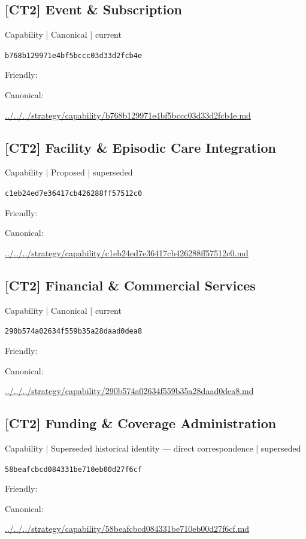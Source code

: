 \documentclass[10pt,a4paper]{article}
\begin{document}
\subsection*{[CT2] Event \& Subscription}
{\small Capability | Canonical | current}\par
\texttt{b768b129971e4bf5bccc03d33d2fcb4e}\par
Friendly: \par
Canonical: \par
{\footnotesize\url{../../../strategy/capability/b768b129971e4bf5bccc03d33d2fcb4e.md}}\par
\subsection*{[CT2] Facility \& Episodic Care Integration}
{\small Capability | Proposed | superseded}\par
\texttt{c1eb24ed7e36417cb426288ff57512c0}\par
Friendly: \par
Canonical: \par
{\footnotesize\url{../../../strategy/capability/c1eb24ed7e36417cb426288ff57512c0.md}}\par
\subsection*{[CT2] Financial \& Commercial Services}
{\small Capability | Canonical | current}\par
\texttt{290b574a02634f559b35a28daad0dea8}\par
Friendly: \par
Canonical: \par
{\footnotesize\url{../../../strategy/capability/290b574a02634f559b35a28daad0dea8.md}}\par
\subsection*{[CT2] Funding \& Coverage Administration}
{\small Capability | Superseded historical identity — direct correspondence | superseded}\par
\texttt{58beafcbcd084331be710eb00d27f6cf}\par
Friendly: \par
Canonical: \par
{\footnotesize\url{../../../strategy/capability/58beafcbcd084331be710eb00d27f6cf.md}}\par
\end{document}

